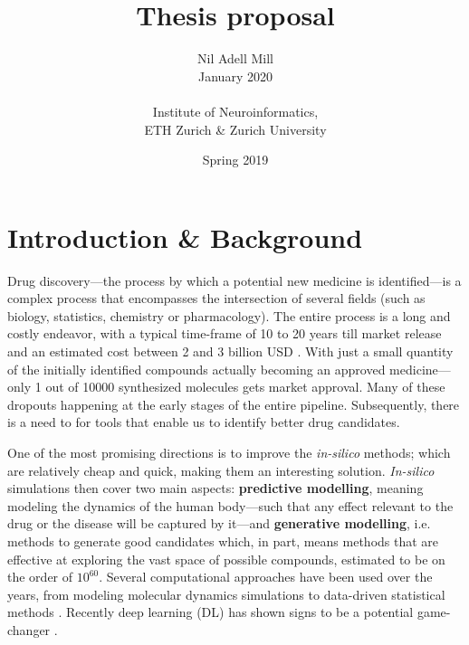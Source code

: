 \documentclass{article}
\begin{document}
\title{\Large Thesis proposal}
\author{Nil Adell Mill \\
        January 2020 \\ \\
        Institute of Neuroinformatics, \\
        ETH Zurich \& Zurich University}
\date{Spring 2019}

\maketitle

    \section*{Introduction \& Background}  

Drug discovery---the process by which a potential new medicine is identified---is a
 complex process that encompasses the intersection of several fields (such as biology,
 statistics, chemistry or pharmacology). The entire process is a long and costly
 endeavor, with a typical time-frame of 10 to 20 years till market release and an
 estimated cost between 2 and 3 billion USD \cite{Schneider2019, Scannell2012}. With
 just a small quantity of the initially identified compounds actually becoming an
 approved medicine—only 1 out of 10000 synthesized molecules gets market approval. Many
 of these dropouts happening at the early stages of the entire pipeline.
 {\color{red}Subsequently}, there is a need to for tools that enable us to identify
 better drug candidates.

One of the most promising directions is to improve the \emph{in-silico} methods; which
 are relatively cheap and quick, making them an interesting solution.
 \emph{In-silico} simulations then cover two main aspects: \textbf{predictive
 modelling}, meaning modeling the dynamics of the human body---such that any effect
 relevant to the drug or the disease will be captured by it---and \textbf{generative
 modelling}, i.e. methods to generate good candidates which, in part, means methods that
 are effective at exploring the vast space of possible compounds, estimated to be on the
 order of $10^{60}$\cite{Reymond2012}. Several computational approaches have been used
 over the years, from modeling molecular dynamics simulations to data-driven statistical
 methods \cite{Hung2014, Kuhn2016}. Recently deep learning (DL) has shown signs to be a
 potential game-changer \cite{Dargan2019}. 
 
\end{document}

